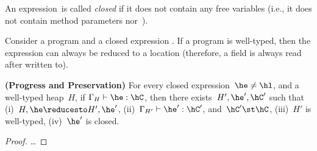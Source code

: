 \documentclass[a4paper]{article}
\begin{document}
An expression~\he is called \emph{closed} if it does not contain
    any free variables (i.e., it does not contain method parameters \hx nor~\this).


Consider a program \hP and a closed expression \he.
If a program is well-typed, then the expression can always be reduced to a location
    (therefore, a field is always read after written to).


\begin{Theorem}[preservation]
  \textbf{(Progress and Preservation)}
    For every closed expression~$\he \neq \hl$, and a well-typed heap~$H$,
        if $\Gamma_{H} \vdash \he : \hC$,
        then there exists~$H',\he',\hC'$ such that
        (i)~$H,\he \reducesto H',\he'$,
        (ii)~$\Gamma_{H'} \vdash \he':\hC'$,
        and~$\hC' \st \hC$,
        (iii)~$H'$ is well-typed,
        (iv)~$\he'$ is closed.
\end{Theorem}
\begin{proof}
\ldots
\end{proof}




\end{document}
